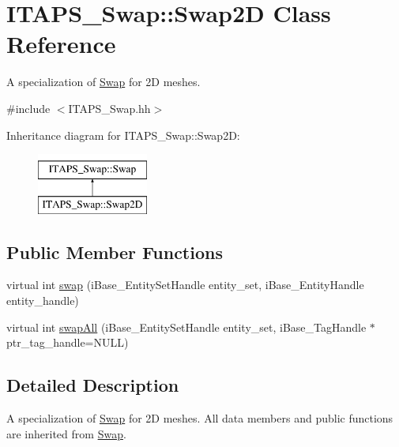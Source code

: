 \hypertarget{class_i_t_a_p_s___swap_1_1_swap2_d}{
\section{ITAPS\_\-Swap::Swap2D Class Reference}
\label{class_i_t_a_p_s___swap_1_1_swap2_d}
}


A specialization of \hyperlink{class_i_t_a_p_s___swap_1_1_swap}{Swap} for 2D meshes.  




{\ttfamily \#include $<$ITAPS\_\-Swap.hh$>$}

Inheritance diagram for ITAPS\_\-Swap::Swap2D:\begin{figure}[H]
\begin{center}
\leavevmode
\includegraphics[height=2cm]{class_i_t_a_p_s___swap_1_1_swap2_d}
\end{center}
\end{figure}
\subsection*{Public Member Functions}
\begin{DoxyCompactItemize}
\item 
virtual int \hyperlink{class_i_t_a_p_s___swap_1_1_swap2_d_a84a78678e5e830d16c725a93f3b5038f}{swap} (iBase\_\-EntitySetHandle entity\_\-set, iBase\_\-EntityHandle entity\_\-handle)
\item 
virtual int \hyperlink{class_i_t_a_p_s___swap_1_1_swap2_d_a4bee7d3a08e3ff6ac85a81ec321479ef}{swapAll} (iBase\_\-EntitySetHandle entity\_\-set, iBase\_\-TagHandle $\ast$ptr\_\-tag\_\-handle=NULL)
\end{DoxyCompactItemize}


\subsection{Detailed Description}
A specialization of \hyperlink{class_i_t_a_p_s___swap_1_1_swap}{Swap} for 2D meshes. All data members and public functions are inherited from \hyperlink{class_i_t_a_p_s___swap_1_1_swap}{Swap}. 

